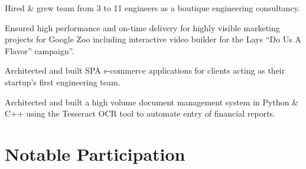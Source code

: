 \documentclass{resume}
\begin{document}
    {\begin{jobitems}
        \item Hired \& grew team from 3 to 11 engineers as a boutique engineering consultancy.
        \item Ensured high performance and on-time delivery for highly visible marketing projects for Google Zoo including interactive video builder for the Lays ``Do Us A Flavor'' campaign''. 
        \item Architected and built SPA e-commerce applications for clients acting as their startup's first engineering team.
        \item Architected and built a high volume document management system in Python \& C++ using the Tesseract OCR tool to automate entry of financial reports.
    \end{jobitems}}

\section{Notable Participation}
\end{document}
